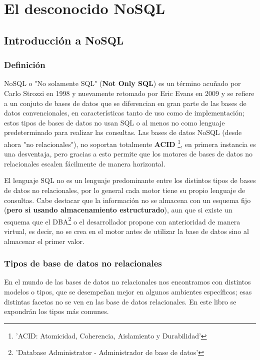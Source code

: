 \part{El desconocido NoSQL} 
\chapter{Introducci\'on a NoSQL}

\section{Definici\'on}

NoSQL o "No solamente SQL" ({\bf Not Only SQL}) es un t\'ermino acu\~nado por Carlo Strozzi en 1998 y nuevamente retomado por Eric Evans en 2009 y se refiere a un conjuto de bases de datos que se diferencian en gran parte de las bases de datos convencionales, en caracter\'isticas tanto de uso como de implementaci\'on; estos tipos de bases de datos no usan SQL o al menos no como lenguaje predeterminado para realizar las consultas. Las bases de datos NoSQL (desde ahora "no relacionales"), no soportan totalmente {\bf ACID} \footnote{'ACID: Atomicidad, Coherencia, Aislamiento y Durabilidad'}, en primera instancia es una desventaja, pero gracias a esto permite que los motores de bases de datos no relacionales escalen f\'acilmente de manera horizontal. 

El lenguaje SQL no es un lenguaje predominante entre los distintos tipos de bases de datos no relacionales, por lo general cada motor tiene su propio lenguaje de consultas. Cabe destacar que la informaci\'on no se almacena con un esquema fijo (\textbf{pero si usando almacenamiento estructurado}), aun que si existe un esquema que el DBA\footnote{'Database Administrator - Administrador de base de datos'} o el desarrollador propone con anterioridad de manera virtual, es decir, no se crea en el motor antes de utilizar la base de datos sino al almacenar el primer valor.

\section{Tipos de base de datos no relacionales}

En el mundo de las bases de datos no relacionales nos encontramos con distintos modelos o tipos, que se desempe\~nan mejor en algunos ambientes espec\'ificos; esas distintas facetas no se ven en las base de datos relacionales. En este libro se expondr\'an los tipos m\'as comunes.

